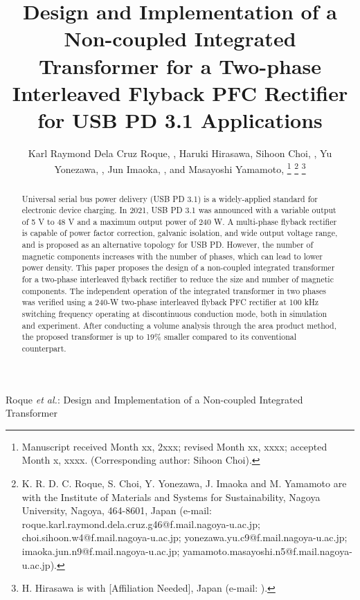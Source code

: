 \documentclass[lettersize,journal]{IEEEtran}
\begin{document}
\title{Design and Implementation of a Non-coupled Integrated Transformer for a Two-phase Interleaved Flyback PFC Rectifier for USB PD 3.1 Applications}

\author{Karl Raymond Dela Cruz Roque, , Haruki Hirasawa, Sihoon Choi, , Yu Yonezawa, , Jun Imaoka, , and Masayoshi Yamamoto, 
\thanks{Manuscript received Month xx, 2xxx; revised Month xx, xxxx; accepted Month x, xxxx. (Corresponding author: Sihoon Choi).}
\thanks{K. R. D. C. Roque, S. Choi, Y. Yonezawa, J. Imaoka and M. Yamamoto are with the Institute of Materials and Systems for Sustainability, Nagoya University, Nagoya, 464-8601, Japan (e-mail: roque.karl.raymond.dela.cruz.g46@f.mail.nagoya-u.ac.jp; choi.sihoon.w4@f.mail.nagoya-u.ac.jp; yonezawa.yu.c9@f.mail.nagoya-u.ac.jp; imaoka.jun.n9@f.mail.nagoya-u.ac.jp; yamamoto.masayoshi.n5@f.mail.nagoya-u.ac.jp).}
\thanks{H. Hirasawa is with [Affiliation Needed], Japan (e-mail: ).}}

%
{Roque \MakeLowercase{\textit{et al.}}: Design and Implementation of a Non-coupled Integrated Transformer}

\maketitle

\begin{abstract}
Universal serial bus power delivery (USB PD 3.1) is a widely-applied standard for electronic device charging. In 2021, USB PD 3.1 was announced with a variable output of 5 V to 48 V and a maximum output power of 240 W. A multi-phase flyback rectifier is capable of power factor correction, galvanic isolation, and wide output voltage range, and is proposed as an alternative topology for USB PD. However, the number of magnetic components increases with the number of phases, which can lead to lower power density. This paper proposes the design of a non-coupled integrated transformer for a two-phase interleaved flyback rectifier to reduce the size and number of magnetic components. The independent operation of the integrated transformer in two phases was verified using a 240-W two-phase interleaved flyback PFC rectifier at 100 kHz switching frequency operating at discontinuous conduction mode, both in simulation and experiment. After conducting a volume analysis through the area product method, the proposed transformer is up to 19\% smaller compared to its conventional counterpart.
\end{abstract}
\end{document}
